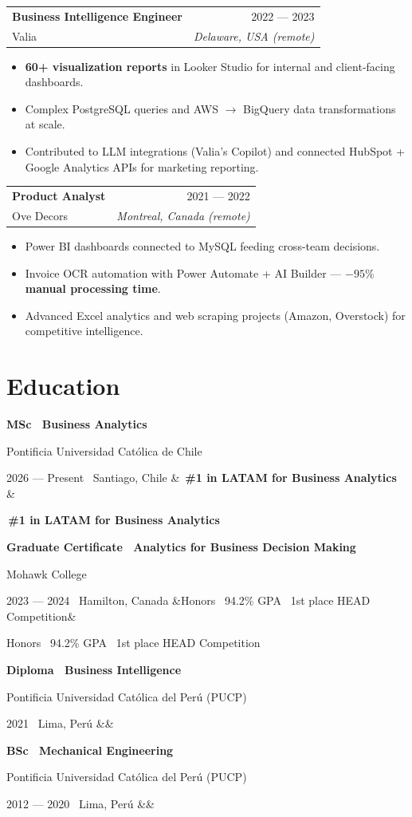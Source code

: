 \documentclass[10pt,letterpaper]{article}
\makeatletter
\newcommand{\jobheader}[4]{%
  \noindent\begin{tabularx}{\linewidth}{@{}X r@{}}
    \textbf{\color{ink}#1} & \textcolor{inkmute}{\small #3} \\
    \textcolor{inkdim}{#2} & \textcolor{inkmute}{\small\itshape #4}
  \end{tabularx}\par\vspace{2pt}
}
\newcommand{\eduentry}[4]{%
  \textbf{\color{ink}#1}\par
  \textcolor{inkdim}{\small #2}\par
  \textcolor{inkmute}{\footnotesize #3}
  \ifx&#4&\else\par\textcolor{ink}{\footnotesize #4}\fi
  \vspace{5pt}
}
\newcommand{\accentchip}[1]{%
  \colorbox{chip}{\textcolor{accent}{\footnotesize\bfseries\,#1\,}}
}
\makeatother
\begin{document}
\jobheader{Business Intelligence Engineer}{Valia}{2022 --- 2023}{Delaware, USA (remote)}
\begin{itemize}
  \item \textbf{60+ visualization reports} in Looker Studio for internal and client-facing dashboards.
  \item Complex PostgreSQL queries and AWS $\rightarrow$ BigQuery data transformations at scale.
  \item Contributed to LLM integrations (Valia's Copilot) and connected HubSpot + Google Analytics APIs for marketing reporting.
\end{itemize}

\jobheader{Product Analyst}{Ove Decors}{2021 --- 2022}{Montreal, Canada (remote)}
\begin{itemize}
  \item Power BI dashboards connected to MySQL feeding cross-team decisions.
  \item Invoice OCR automation with Power Automate + AI Builder --- \textbf{$-95\%$ manual processing time}.
  \item Advanced Excel analytics and web scraping projects (Amazon, Overstock) for competitive intelligence.
\end{itemize}

\section*{Education}

\eduentry{MSc \textperiodcentered\ Business Analytics}%
  {Pontificia Universidad Católica de Chile}%
  {2026 --- Present \textperiodcentered\ Santiago, Chile}%
  {\accentchip{\#1 in LATAM for Business Analytics}}

\eduentry{Graduate Certificate \textperiodcentered\ Analytics for Business Decision Making}%
  {Mohawk College}%
  {2023 --- 2024 \textperiodcentered\ Hamilton, Canada}%
  {Honors \textperiodcentered\ 94.2\% GPA \textperiodcentered\ 1st place HEAD Competition}

\eduentry{Diploma \textperiodcentered\ Business Intelligence}%
  {Pontificia Universidad Católica del Perú (PUCP)}%
  {2021 \textperiodcentered\ Lima, Perú}{}

\eduentry{BSc \textperiodcentered\ Mechanical Engineering}%
  {Pontificia Universidad Católica del Perú (PUCP)}%
  {2012 --- 2020 \textperiodcentered\ Lima, Perú}{}
\end{document}
